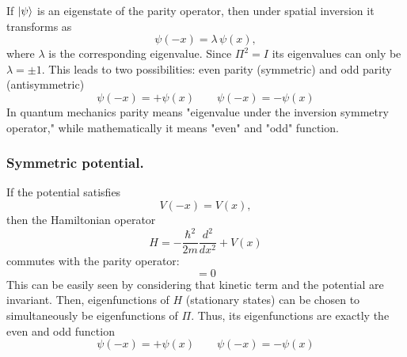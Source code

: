 \documentclass[../../../main.tex]{subfiles}
\begin{document}
If $\ket{\psi}$ is an eigenstate of the parity operator, then under spatial inversion it transforms as
\begin{equation*}
\psi(-x) = \lambda \, \psi(x) ,
\end{equation*}
where $\lambda$ is the corresponding eigenvalue. 
Since $\Pi^2 = I $ its eigenvalues can only be $\lambda = \pm 1$. 
This leads to two possibilities: even parity (symmetric) and odd parity (antisymmetric)
\begin{equation*}
       \psi(-x) = +\psi(x) \qquad    \psi(-x) = -\psi(x) 
\end{equation*}
In quantum mechanics parity means "eigenvalue under the inversion symmetry operator," while mathematically it means "even" and "odd" function.

\subsubsection{Symmetric potential.}
If the potential satisfies
\begin{equation*}
V(-x) = V(x) ,
\end{equation*}
then the Hamiltonian operator
\begin{equation*}
H = -\frac{\hbar^2}{2m}\frac{d^2}{dx^2} + V(x)
\end{equation*}
commutes with the parity operator:
\begin{equation*}
[H, \Pi] = 0 
\end{equation*}
This can be easily seen  by considering that kinetic term and the potential are invariant.
Then, eigenfunctions of $H$ (stationary states) can be chosen to simultaneously be eigenfunctions of $\Pi$.
Thus, its eigenfunctions are exactly the even and odd function
\begin{equation*}
       \psi(-x) = +\psi(x) \qquad    \psi(-x) = -\psi(x) 
\end{equation*}
\end{document}
